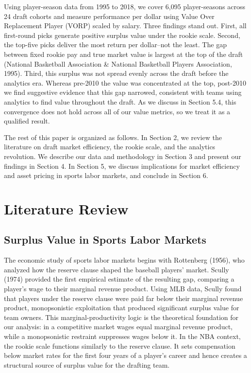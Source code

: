 \documentclass[12pt,letterpaper]{article}
\begin{document}
Using player-season data from 1995 to 2018, we cover 6,095 player-seasons across 24 draft cohorts and measure performance per dollar using Value Over Replacement Player (VORP) scaled by salary. Three findings stand out. First, all first-round picks generate positive surplus value under the rookie scale. Second, the top-five picks deliver the most return per dollar--not the least. The gap between fixed rookie pay and true market value is largest at the top of the draft (National Basketball Association \& National Basketball Players Association, 1995). Third, this surplus was not spread evenly across the draft before the analytics era. Whereas pre-2010 the value was concentrated at the top, post-2010 we find suggestive evidence that this gap narrowed, consistent with teams using analytics to find value throughout the draft. As we discuss in Section 5.4, this convergence does not hold across all of our value metrics, so we treat it as a qualified result.

The rest of this paper is organized as follows. In Section 2, we review the literature on draft market efficiency, the rookie scale, and the analytics revolution. We describe our data and methodology in Section 3 and present our findings in Section 4. In Section 5, we discuss implications for market efficiency and asset pricing in sports labor markets, and conclude in Section 6.


\section{Literature Review}

\subsection{Surplus Value in Sports Labor Markets}

The economic study of sports labor markets begins with Rottenberg (1956), who analyzed how the reserve clause shaped the baseball players' market. Scully (1974) provided the first empirical estimate of the resulting gap, comparing a player's wage to their marginal revenue product. Using MLB data, Scully found that players under the reserve clause were paid far below their marginal revenue product, monopsonistic exploitation that produced significant surplus value for team owners. This marginal-productivity logic is the theoretical foundation for our analysis: in a competitive market wages equal marginal revenue product, while a monopsonistic restraint suppresses wages below it. In the NBA context, the rookie scale functions similarly to the reserve clause. It sets compensation below market rates for the first four years of a player's career and hence creates a structural source of surplus value for the drafting team.
\end{document}
